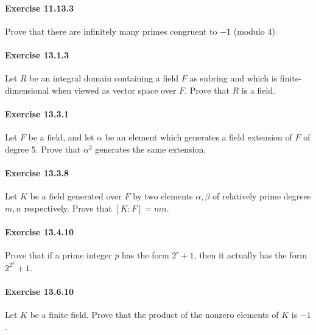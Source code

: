 \documentclass{article}
\begin{document}
\paragraph{Exercise 11.13.3} Prove that there are infinitely many primes congruent to $-1$ (modulo $4$).

\paragraph{Exercise 13.1.3} Let $R$ be an integral domain containing a field $F$ as subring and which is finite-dimensional when viewed as vector space over $F$. Prove that $R$ is a field.

\paragraph{Exercise 13.3.1} Let $F$ be a field, and let $\alpha$ be an element which generates a field extension of $F$ of degree 5. Prove that $\alpha^2$ generates the same extension.

\paragraph{Exercise 13.3.8} Let $K$ be a field generated over $F$ by two elements $\alpha, \beta$ of relatively prime degrees $m, n$ respectively. Prove that $[K: F]=m n$.

\paragraph{Exercise 13.4.10} Prove that if a prime integer $p$ has the form $2^r+1$, then it actually has the form $2^{2^k}+1$.

\paragraph{Exercise 13.6.10} Let $K$ be a finite field. Prove that the product of the nonzero elements of $K$ is $-1$.
\end{document}
